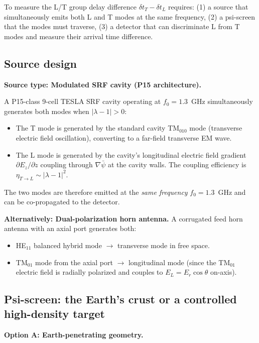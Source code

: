 \documentclass[11pt]{article}
\newcommand{\psibar}{\bar{\psi}}
\begin{document}
To measure the L/T group delay difference $\delta t_T - \delta t_L$ requires:
(1) a source that simultaneously emits both L and T modes at the same frequency,
(2) a psi-screen that the modes must traverse,
(3) a detector that can discriminate L from T modes and measure their arrival time difference.

\subsection{Source design}

\textbf{Source type: Modulated SRF cavity (P15 architecture).}

A P15-class 9-cell TESLA SRF cavity operating at $f_0 = 1.3$~GHz simultaneously
generates both modes when $|\lambda-1| > 0$:
\begin{itemize}
\item The T mode is generated by the standard cavity TM$_{010}$ mode
  (transverse electric field oscillation), converting to a far-field
  transverse EM wave.
\item The L mode is generated by the cavity's longitudinal electric field
  gradient $\partial E_z/\partial z$ coupling through $\nabla\psibar$ at the
  cavity walls. The coupling efficiency is $\eta_{T\to L} \sim |\lambda-1|^2$.
\end{itemize}

The two modes are therefore emitted at the \emph{same frequency} $f_0 = 1.3$~GHz
and can be co-propagated to the detector.

\textbf{Alternatively: Dual-polarization horn antenna.}
A corrugated feed horn antenna with an axial port generates both:
\begin{itemize}
\item HE$_{11}$ balanced hybrid mode $\to$ transverse mode in free space.
\item TM$_{01}$ mode from the axial port $\to$ longitudinal mode (since the
  TM$_{01}$ electric field is radially polarized and couples to
  $E_L = E_r\cos\theta$ on-axis).
\end{itemize}

\subsection{Psi-screen: the Earth's crust or a controlled high-density target}

\textbf{Option A: Earth-penetrating geometry.}
\end{document}
